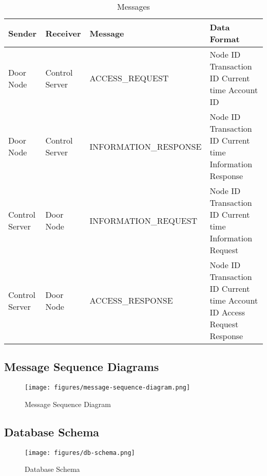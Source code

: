 \begin{table*}[htb]
\begin{tabular}{ l | l | l | p{4.5cm} }
\toprule
Sender & Receiver & Message & Data Format\\
\midrule
Door Node & Control Server & ACCESS\_REQUEST &
Node ID \newline Transaction ID \newline Current time \newline Account ID\\
\hline
Door Node & Control Server & INFORMATION\_RESPONSE &
Node ID \newline Transaction ID \newline Current time \newline Information Response\\
\hline
Control Server & Door Node & INFORMATION\_REQUEST &
Node ID \newline Transaction ID \newline Current time \newline Information Request\\
\hline
Control Server & Door Node & ACCESS\_RESPONSE &
Node ID \newline Transaction ID \newline Current time \newline Account ID \newline Access Request Response\\
\bottomrule
\end{tabular}
\caption{Messages}
\end{table*}

\subsection{Message Sequence Diagrams}

\begin{figure}[!htb]
\centering
\texttt{[image: figures/message-sequence-diagram.png]}
\caption{Message Sequence Diagram}
\label{fig:message-sequence-diagram}
\end{figure}

\subsection{Database Schema}

\begin{figure}[!htb]
\texttt{[image: figures/db-schema.png]}
\caption{Database Schema}
\end{figure}

